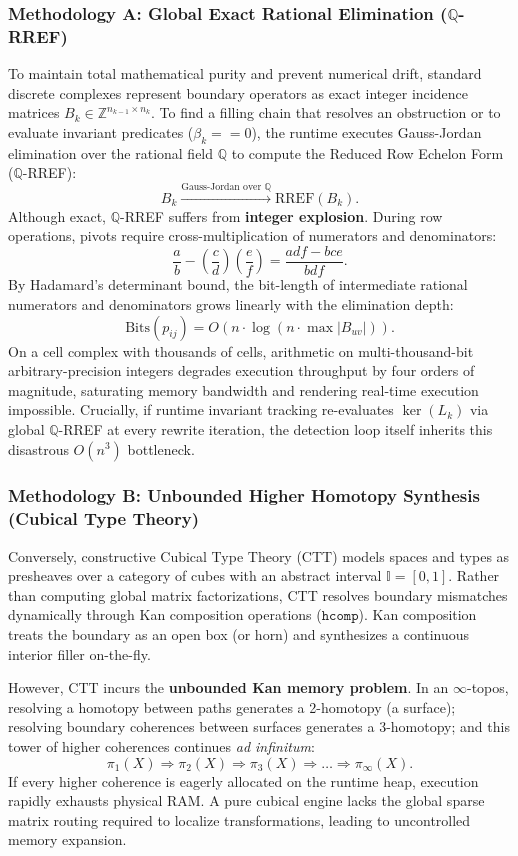 \documentclass[acmsmall,screen,nonacm]{acmart}
\newcommand{\hcomp}{\texttt{hcomp}}
\begin{document}
\subsubsection{Methodology A: Global Exact Rational Elimination (\texorpdfstring{$\mathbb{Q}$-RREF}{Q-RREF})}
To maintain total mathematical purity and prevent numerical drift, standard discrete complexes represent boundary operators as exact integer incidence matrices $B_k \in \mathbb{Z}^{n_{k-1} \times n_k}$. To find a filling chain that resolves an obstruction or to evaluate invariant predicates ($\beta_k == 0$), the runtime executes Gauss-Jordan elimination over the rational field $\mathbb{Q}$ to compute the Reduced Row Echelon Form ($\mathbb{Q}$-RREF):
\[
  B_k \xrightarrow{\text{Gauss-Jordan over } \mathbb{Q}} \mathrm{RREF}(B_k).
\]
Although exact, $\mathbb{Q}$-RREF suffers from \textbf{integer explosion}. During row operations, pivots require cross-multiplication of numerators and denominators:
\[
  \frac{a}{b} - \left(\frac{c}{d}\right)\left(\frac{e}{f}\right) = \frac{a d f - b c e}{b d f}.
\]
By Hadamard's determinant bound, the bit-length of intermediate rational numerators and denominators grows linearly with the elimination depth:
\[
  \mathrm{Bits}(p_{ij}) = O(n \cdot \log(n \cdot \max |B_{uv}|)).
\]
On a cell complex with thousands of cells, arithmetic on multi-thousand-bit arbitrary-precision integers degrades execution throughput by four orders of magnitude, saturating memory bandwidth and rendering real-time execution impossible. Crucially, if runtime invariant tracking re-evaluates $\ker(L_k)$ via global $\mathbb{Q}$-RREF at every rewrite iteration, the detection loop itself inherits this disastrous $O(n^3)$ bottleneck.

\subsubsection{Methodology B: Unbounded Higher Homotopy Synthesis (Cubical Type Theory)}
Conversely, constructive Cubical Type Theory (CTT) models spaces and types as presheaves over a category of cubes with an abstract interval $\mathbb{I} = [0,1]$. Rather than computing global matrix factorizations, CTT resolves boundary mismatches dynamically through Kan composition operations ($\hcomp$). Kan composition treats the boundary as an open box (or horn) and synthesizes a continuous interior filler on-the-fly.

However, CTT incurs the \textbf{unbounded Kan memory problem}. In an $\infty$-topos, resolving a homotopy between paths generates a 2-homotopy (a surface); resolving boundary coherences between surfaces generates a 3-homotopy; and this tower of higher coherences continues \emph{ad infinitum}:
\[
  \pi_1(X) \Longrightarrow \pi_2(X) \Longrightarrow \pi_3(X) \Longrightarrow \dots \Longrightarrow \pi_\infty(X).
\]
If every higher coherence is eagerly allocated on the runtime heap, execution rapidly exhausts physical RAM. A pure cubical engine lacks the global sparse matrix routing required to localize transformations, leading to uncontrolled memory expansion.
\end{document}
